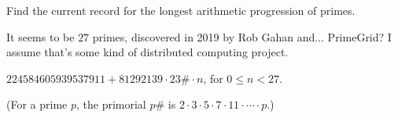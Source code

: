 \documentclass[../main.tex]{subfiles}
\begin{document}
\begin{ex} \label{2.40}
  Find the current record for the longest arithmetic progression of primes.
\end{ex}

It seems to be $27$ primes, discovered in 2019 by Rob Gahan and... PrimeGrid? I assume that's some kind of distributed computing project.

$224584605939537911 + 81292139 \cdot 23\# \cdot n$, for $0 \leq n < 27$.

(For a prime $p$, the primorial $p\#$ is $2 \cdot 3 \cdot 5 \cdot 7 \cdot 11 \cdot \cdots \cdot p$.)
\end{document}
